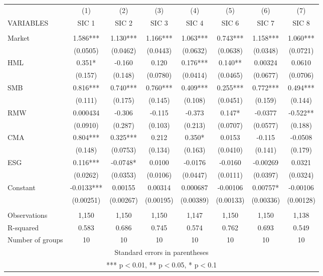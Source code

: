 \begin{tabular}{lccccccc} \hline
 & (1) & (2) & (3) & (4) & (5) & (6) & (7) \\
VARIABLES & SIC 1 & SIC 2 & SIC 3 & SIC 4 & SIC 6 & SIC 7 & SIC 8 \\ \hline
 &  &  &  &  &  &  &  \\
Market & 1.586*** & 1.130*** & 1.166*** & 1.063*** & 0.743*** & 1.158*** & 1.060*** \\
 & (0.0505) & (0.0462) & (0.0443) & (0.0632) & (0.0638) & (0.0348) & (0.0721) \\
HML & 0.351* & -0.160 & 0.120 & 0.176*** & 0.140** & 0.00324 & 0.0610 \\
 & (0.157) & (0.148) & (0.0780) & (0.0414) & (0.0465) & (0.0677) & (0.0706) \\
SMB & 0.816*** & 0.740*** & 0.760*** & 0.409*** & 0.255*** & 0.772*** & 0.494*** \\
 & (0.111) & (0.175) & (0.145) & (0.108) & (0.0451) & (0.159) & (0.144) \\
RMW & 0.000434 & -0.306 & -0.115 & -0.373 & 0.147* & -0.0377 & -0.522** \\
 & (0.0910) & (0.287) & (0.103) & (0.213) & (0.0707) & (0.0577) & (0.188) \\
CMA & 0.804*** & 0.325*** & 0.212 & 0.350* & 0.0153 & -0.115 & -0.0508 \\
 & (0.148) & (0.0753) & (0.134) & (0.163) & (0.0410) & (0.141) & (0.179) \\
ESG & 0.116*** & -0.0748* & 0.0100 & -0.0176 & -0.0160 & -0.00269 & 0.0321 \\
 & (0.0262) & (0.0353) & (0.0106) & (0.0447) & (0.0111) & (0.0397) & (0.0324) \\
Constant & -0.0133*** & 0.00155 & 0.00314 & 0.000687 & -0.00106 & 0.00757* & -0.00106 \\
 & (0.00251) & (0.00267) & (0.00195) & (0.00389) & (0.00133) & (0.00336) & (0.00128) \\
 &  &  &  &  &  &  &  \\
Observations & 1,150 & 1,150 & 1,150 & 1,147 & 1,150 & 1,150 & 1,138 \\
R-squared & 0.583 & 0.686 & 0.745 & 0.574 & 0.762 & 0.693 & 0.549 \\
 Number of groups & 10 & 10 & 10 & 10 & 10 & 10 & 10 \\ \hline
\multicolumn{8}{c}{ Standard errors in parentheses} \\
\multicolumn{8}{c}{ *** p$<$0.01, ** p$<$0.05, * p$<$0.1} \\
\end{tabular}
